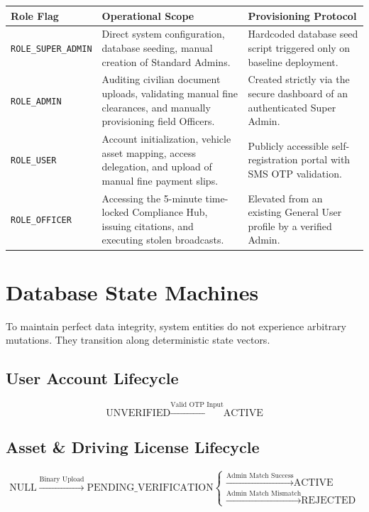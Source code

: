 \documentclass[12pt, a4paper]{article}
\begin{document}
\vspace{0.4cm}
\begin{tabularx}{\textwidth}{|l|X|X|}
\hline
\textbf{Role Flag} & \textbf{Operational Scope} & \textbf{Provisioning Protocol} \\ \hline
\texttt{ROLE\_SUPER\_ADMIN} & Direct system configuration, database seeding, manual creation of Standard Admins. & Hardcoded database seed script triggered only on baseline deployment. \\ \hline
\texttt{ROLE\_ADMIN} & Auditing civilian document uploads, validating manual fine clearances, and manually provisioning field Officers. & Created strictly via the secure dashboard of an authenticated Super Admin. \\ \hline
\texttt{ROLE\_USER} & Account initialization, vehicle asset mapping, access delegation, and upload of manual fine payment slips. & Publicly accessible self-registration portal with SMS OTP validation. \\ \hline
\texttt{ROLE\_OFFICER} & Accessing the 5-minute time-locked Compliance Hub, issuing citations, and executing stolen broadcasts. & Elevated from an existing General User profile by a verified Admin. \\ \hline
\end{tabularx}
\vspace{0.4cm}

\section{Database State Machines}
To maintain perfect data integrity, system entities do not experience arbitrary mutations. They transition along deterministic state vectors.

\subsection{User Account Lifecycle}
$$\text{UNVERIFIED} \xrightarrow{\text{Valid OTP Input}} \text{ACTIVE}$$

\subsection{Asset \& Driving License Lifecycle}
$$\text{NULL} \xrightarrow{\text{Binary Upload}} \text{PENDING\_VERIFICATION} \begin{cases} 
\xrightarrow{\text{Admin Match Success}} \text{ACTIVE} \\
\xrightarrow{\text{Admin Match Mismatch}} \text{REJECTED} 
\end{cases}$$
\end{document}
